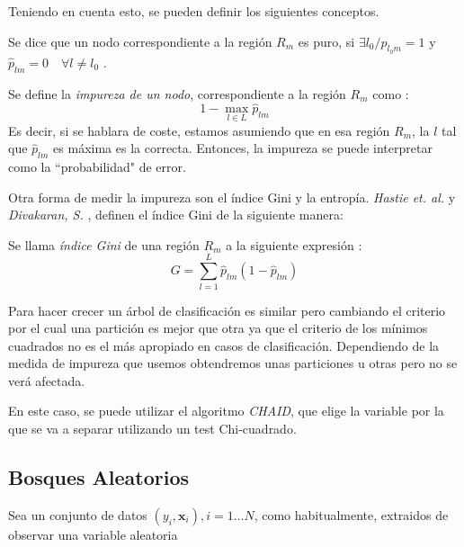 \noindent Teniendo en cuenta esto, se pueden definir los siguientes conceptos.
\begin{defi}
Se dice que un nodo correspondiente a la región $R_m$ es puro, si $\exists l_0/ p_{l_0 m}=1$ y $\hat{p}_{lm}=0 \quad \forall l\neq l_0$ \cite{Divakaran 2022, Hastie 2001, James 2013, Brown 2004}. 
\end{defi}

\begin{defi}
Se define la \emph{impureza de un nodo}, correspondiente a la región $R_m$ como \cite{Brown 2004}:
\begin{equation}
1-\max_{l\in L} \hat{p}_{lm}
\end{equation}
\noindent Es decir, si se hablara de coste, estamos asumiendo que en esa región $R_m$, la $l$ tal que $\hat{p}_{lm}$ es máxima es la correcta. Entonces, la impureza se puede interpretar como la ``probabilidad" de error. 
\end{defi}
\noindent Otra forma de medir la impureza son el índice Gini y la entropía. \emph{Hastie et. al.} y \emph{Divakaran, S.} \cite{Hastie 2001, Divakaran 2022}, definen el índice Gini de la siguiente manera:
\begin{defi}
Se llama \emph{índice Gini} de una región $R_m$ a la siguiente expresión \cite{Hastie 2001, James 2013}:
\begin{equation}
G=\sum_{l=1}^L\hat{p}_{lm}(1-\hat{p}_{lm})
\end{equation}
\end{defi}

\noindent Para hacer crecer un árbol de clasificación es similar pero cambiando el criterio por el cual una partición es mejor que otra ya que el criterio de los mínimos cuadrados no es el más apropiado en casos de clasificación. Dependiendo de la medida de impureza que usemos obtendremos unas particiones u otras pero no se verá afectada. 

\noindent En este caso, se puede utilizar el algoritmo \emph{CHAID}, que elige la variable por la que se va a separar utilizando un test Chi-cuadrado. 
\subsection{Bosques Aleatorios}
\noindent Sea un conjunto de datos $(y_i,\mathbf{x}_i),i=1\ldots N$, como habitualmente, extraidos de observar una variable aleatoria 

